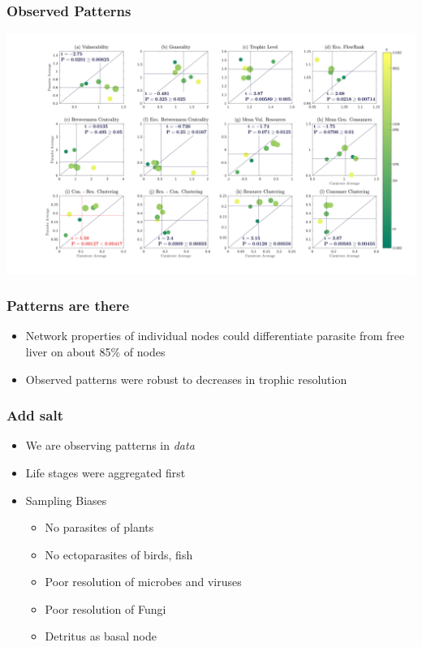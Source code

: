 \documentclass[table]{beamer}
\begin{document}
\begin{frame}
    \frametitle{Observed Patterns}
    \includegraphics[width=\textwidth]{../Chapter2/figures/initialPropsMaxLinkage.png}
\end{frame}

\begin{frame}
    \frametitle{Patterns are there}
    \begin{itemize}[<+->]
        \item Network properties of individual nodes could differentiate
            parasite from free liver on about 85\% of nodes
        \item Observed patterns were robust to decreases in trophic resolution
    \end{itemize}
\end{frame}

\begin{frame}
    \frametitle{Add salt}
    \begin{itemize}[<+->]
        \item We are observing patterns in \textit{data} 
        \item Life stages were aggregated first
        \item Sampling Biases
            \begin{itemize}
                \item No parasites of plants
                \item No ectoparasites of birds, fish
                \item Poor resolution of microbes and viruses
                \item Poor resolution of Fungi
                \item Detritus as basal node
            \end{itemize}
    \end{itemize}
\end{frame}
\end{document}
